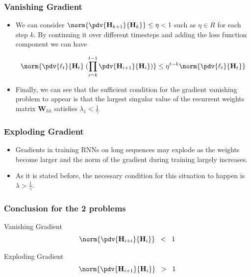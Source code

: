 \documentclass[11pt,]{beamer}
\begin{document}
\begin{frame}
	\frametitle{Vanishing Gradient}
	\begin{itemize}
		\item We can consider $\norm{\pdv{\mathbf{H}_{k+1}}{\mathbf{H}_k}} \le \eta < 1$ such as $\eta \in R$ for each
		step $k$. By continuing it over different timesteps and adding
		the loss function component we can have
		\bigskip
	\begin{block}{}
		\begin{equation*}
			\norm{\pdv{\ell_t}{\mathbf{H}_t} \; (\prod_{i=k}^{t-1} \pdv{\mathbf{H}_{i+1}}{\mathbf{H}_i})} \le \eta^{t-k}  \norm{\pdv{\ell_t}{\mathbf{H}_t}}
		\end{equation*}
	\end{block}
		\bigskip
		\item Finally, we can see that the sufficient condition for
		the gradient vanishing problem to appear is that the largest
		singular value of the recurrent weights matrix $\mathbf{W}_{hh}$
		satisfies $\lambda_1 < \frac{1}{\gamma}$
\end{itemize}
\end{frame}

\begin{frame}
	\frametitle{Exploding Gradient}
	\begin{itemize}
		\item Gradients in training RNNs on long sequences
		may explode as the weights become larger and the norm of
		the gradient during training largely increases.
		\bigskip
		\item  As it is stated before, the necessary condition for this situation to happen is
		$\lambda > \frac{1}{\gamma}$.
	\end{itemize}
\end{frame}

\begin{frame}
	\frametitle{Conclusion for the 2 problems}
	\begin{block}{Vanishing Gradient}
		\begin{equation*}
			 \norm{\pdv{\mathbf{H}_{i+i}}{\mathbf{H}_i}} \;\; < \;\; 1
		\end{equation*}
	\end{block}
	\bigskip
	\bigskip
	\begin{block}{Exploding Gradient}
		\begin{equation*}
			\norm{\pdv{\mathbf{H}_{i+1}}{\mathbf{H}_i}} \;\; > \;\; 1
		\end{equation*}
	\end{block}
\end{frame}
\end{document}
